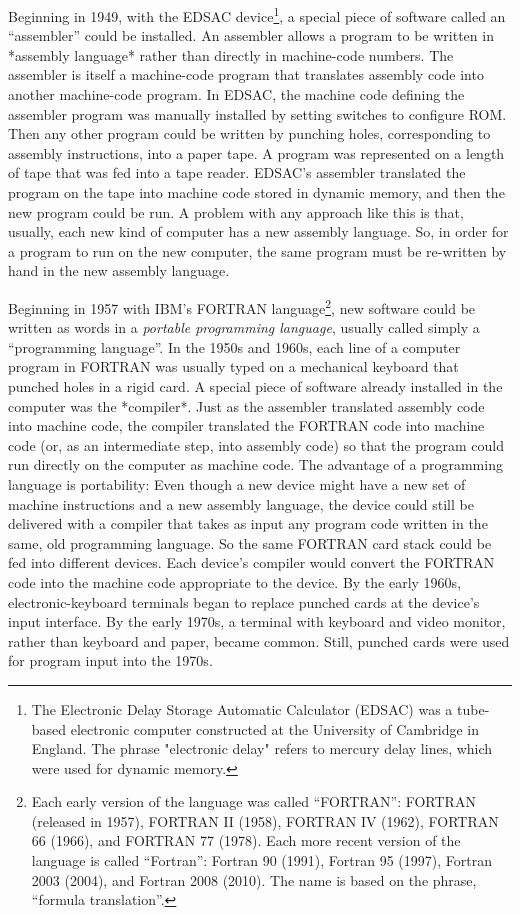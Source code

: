 \documentclass[twocolumn]{book}
\begin{document}
Beginning in 1949, with the EDSAC device\footnote{%
   The Electronic Delay Storage Automatic Calculator (EDSAC) was a tube-based
   electronic computer constructed at the University of Cambridge in England.
   The phrase "electronic delay" refers to mercury delay lines, which were used
   for dynamic memory.},
a special piece of software called an ``assembler'' could be installed.  An
assembler allows a program to be written in *assembly language* rather than
directly in machine-code numbers.  The assembler is itself a machine-code
program that translates assembly code into another machine-code program.  In
EDSAC, the machine code defining the assembler program was manually installed
by setting switches to configure ROM.  Then any other program could be written
by punching holes, corresponding to assembly instructions, into a paper tape.
A program was represented on a length of tape that was fed into a tape reader.
EDSAC's assembler translated the program on the tape into machine code stored
in dynamic memory, and then the new program could be run.  A problem with any
approach like this is that, usually, each new kind of computer has a new
assembly language.  So, in order for a program to run on the new computer, the
same program must be re-written by hand in the new assembly language.

Beginning in 1957 with IBM's FORTRAN language\footnote{%
   Each early version of the language was called ``FORTRAN'': FORTRAN (released
   in 1957), FORTRAN II (1958), FORTRAN IV (1962), FORTRAN 66 (1966), and
   FORTRAN 77 (1978).  Each more recent version of the language is called
   ``Fortran'': Fortran 90 (1991), Fortran 95 (1997), Fortran 2003 (2004), and
   Fortran 2008 (2010).  The name is based on the phrase, ``formula
   translation''.},
new software could be written as words in a \emph{portable programming
language}, usually called simply a ``programming language''.  In the 1950s and
1960s, each line of a computer program in FORTRAN was usually typed on a
mechanical keyboard that punched holes in a rigid card.  A special piece of
software already installed in the computer was the *compiler*.  Just as the
assembler translated assembly code into machine code, the compiler translated
the FORTRAN code into machine code (or, as an intermediate step, into assembly
code) so that the program could run directly on the computer as machine code.
The advantage of a programming language is portability: Even though a new
device might have a new set of machine instructions and a new assembly
language, the device could still be delivered with a compiler that takes as
input any program code written in the same, old programming language.  So the
same FORTRAN card stack could be fed into different devices.  Each device's
compiler would convert the FORTRAN code into the machine code appropriate to
the device.  By the early 1960s, electronic-keyboard terminals began to replace
punched cards at the device's input interface. By the early 1970s, a terminal
with keyboard and video monitor, rather than keyboard and paper, became common.
Still, punched cards were used for program input into the 1970s.
\end{document}
